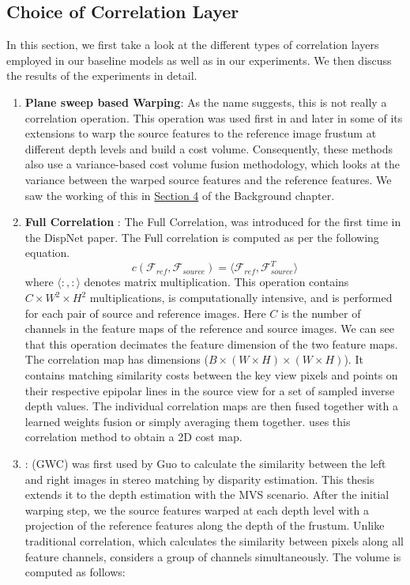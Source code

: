 \subsection{Choice of Correlation Layer}\label{subsec:cvc}
In this section, we first take a look at the different types of correlation layers employed in our baseline models as well as in our experiments. We then discuss the results of the experiments in detail.

\begin{enumerate}
    \item \textbf{Plane sweep based Warping}\cite{Yao2018}: As the name suggests, this is not really a correlation operation. This operation was used first in {\mvsn} and later in some of its extensions \cite{Gu2020, yang2019hierarchical, Yao2019} to warp the source features to the reference image frustum at different depth levels and build a cost volume. Consequently, these methods also use a variance-based cost volume fusion methodology, which looks at the variance between the warped source features and the reference features. We saw the working of this in \hyperref[sec:multiviewster]{Section 4} of the Background chapter. 
    \item \textbf{Full Correlation} \cite{Mayer2016}: The Full Correlation, was introduced for the first time in the DispNet paper. The Full correlation is computed as per the following equation.
    \begin{equation}
        c(\mathcal{F}_{ref}, \mathcal{F}_{source}) = \langle \mathcal{F}_{ref} , \mathcal{F}_{source}^T \rangle
    \end{equation} where $\langle:,:\rangle$ denotes matrix multiplication.
    This operation contains  \(C \times W^2\times H^2\) multiplications, is computationally intensive, and is performed for each pair of source and reference images. Here \(C\) is the number of channels in the feature maps of the reference and source images. We can see that this operation decimates the feature dimension of the two feature maps. The correlation map has dimensions ($B \times (W\times H) \times (W\times H)$). It contains matching similarity costs between the key view pixels and points on their respective epipolar lines in the source view for a set of sampled inverse depth values. The individual correlation maps are then fused together with a learned weights fusion or simply averaging them together. {\rmvd} uses this correlation method to obtain a 2D cost map. 
    \item \textbf{{\gwc}} \cite{guo2019group}: {\gwc} (GWC) was first used by Guo {\etal} to calculate the similarity between the left and right images in stereo matching by disparity estimation. This thesis extends it to the depth estimation with the MVS scenario. After the initial warping step, we the source features warped at each depth level with a projection of the reference features along the depth of the frustum. Unlike traditional correlation, which calculates the similarity between pixels along all feature channels, {\gwc} considers a group of channels simultaneously. The {\gwc} volume is computed as follows: 

\end{enumerate}
